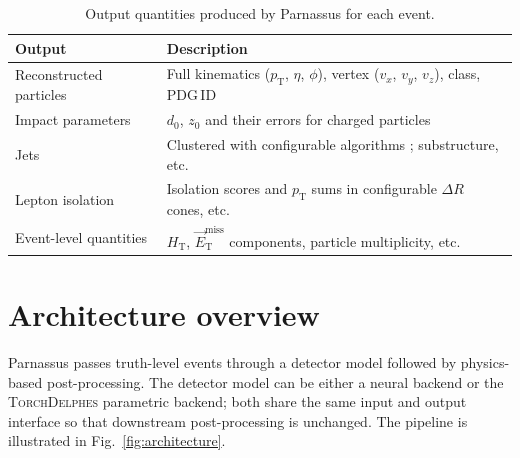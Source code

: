 \documentclass[11pt,a4paper]{article}          %
\begin{document}
\begin{table}[htbp]
\centering
\caption{Output quantities produced by Parnassus for each event.}
\label{tab:outputs}
\begin{tabular}{@{}ll@{}}
\toprule
\textbf{Output} & \textbf{Description} \\
\midrule
Reconstructed particles & Full kinematics ($p_\mathrm{T}$, $\eta$, $\phi$), vertex
  ($v_x$, $v_y$, $v_z$), class, PDG\,ID \\
Impact parameters & $d_0$, $z_0$ and their errors for charged particles \\
Jets & Clustered with configurable algorithms ;
  substructure, etc. \\
Lepton isolation & Isolation scores and $p_\mathrm{T}$ sums in configurable
  $\Delta R$ cones, etc. \\
Event-level quantities & $H_\mathrm{T}$, $\vec{E}_\mathrm{T}^\mathrm{miss}$
  components, particle multiplicity, etc. \\
\bottomrule
\end{tabular}
\end{table}

\section{Architecture overview}
\label{sec:architecture}

Parnassus passes truth-level events through a detector model followed by
physics-based post-processing. The detector model can be either a neural
backend or the \textsc{TorchDelphes} parametric backend; both share the same
input and output interface so that downstream post-processing is unchanged.
The pipeline is illustrated in Fig.~\ref{fig:architecture}.
\end{document}

